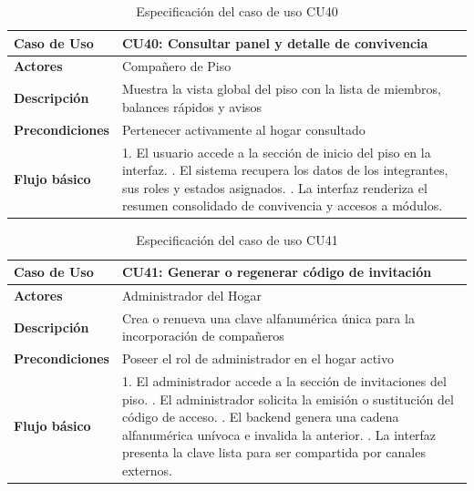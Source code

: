 \begin{table}[H]
\centering
\begin{tabular}{|p{3.2cm}|p{11.3cm}|}
\hline
\textbf{Caso de Uso} & \textbf{CU40: Consultar panel y detalle de convivencia} \\ \hline
\textbf{Actores} & Compañero de Piso \\ \hline
\textbf{Descripción} & Muestra la vista global del piso con la lista de miembros, balances rápidos y avisos \\ \hline
\textbf{Precondiciones} & Pertenecer activamente al hogar consultado \\ \hline
\textbf{Flujo básico} & 
1. El usuario accede a la sección de inicio del piso en la interfaz. \newline
2. El sistema recupera los datos de los integrantes, sus roles y estados asignados. \newline
3. La interfaz renderiza el resumen consolidado de convivencia y accesos a módulos. \\ \hline
\end{tabular}
\caption{Especificación del caso de uso CU40}
\label{tab:cu40}
\end{table}

\begin{table}[H]
\centering
\begin{tabular}{|p{3.2cm}|p{11.3cm}|}
\hline
\textbf{Caso de Uso} & \textbf{CU41: Generar o regenerar código de invitación} \\ \hline
\textbf{Actores} & Administrador del Hogar \\ \hline
\textbf{Descripción} & Crea o renueva una clave alfanumérica única para la incorporación de compañeros \\ \hline
\textbf{Precondiciones} & Poseer el rol de administrador en el hogar activo \\ \hline
\textbf{Flujo básico} & 
1. El administrador accede a la sección de invitaciones del piso. \newline
2. El administrador solicita la emisión o sustitución del código de acceso. \newline
3. El backend genera una cadena alfanumérica unívoca e invalida la anterior. \newline
4. La interfaz presenta la clave lista para ser compartida por canales externos. \\ \hline
\end{tabular}
\caption{Especificación del caso de uso CU41}
\label{tab:cu41}
\end{table}

